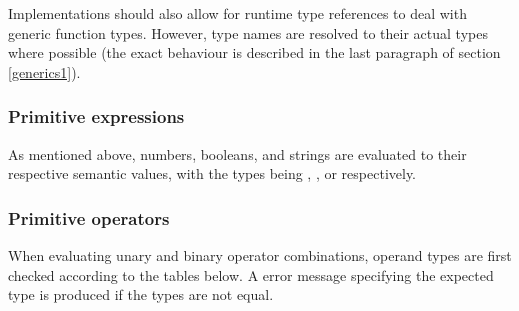 Implementations should also allow for runtime type references to deal with generic function types.
However, type names are resolved to their actual types where possible (the exact behaviour is described in the last paragraph of section \ref{generics1}).


\subsubsection*{Primitive expressions}

As mentioned above, numbers, booleans, and strings are evaluated to their respective semantic values, with the types being , , or  respectively.

\subsubsection*{Primitive operators}

When evaluating unary and binary operator combinations, 
operand types are first checked according to the tables below.
A error message specifying the expected type is produced if the types are not equal.

